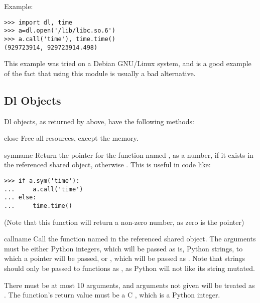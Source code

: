 Example:

\begin{verbatim}
>>> import dl, time
>>> a=dl.open('/lib/libc.so.6')
>>> a.call('time'), time.time()
(929723914, 929723914.498)
\end{verbatim}

This example was tried on a Debian GNU/Linux system, and is a good
example of the fact that using this module is usually a bad alternative.

\subsection{Dl Objects \label{dl-objects}}

Dl objects, as returned by  above, have the
following methods:

\begin{methoddesc}{close}{}
Free all resources, except the memory.
\end{methoddesc}

\begin{methoddesc}{sym}{name}
Return the pointer for the function named , as a number, if
it exists in the referenced shared object, otherwise . This
is useful in code like:

\begin{verbatim}
>>> if a.sym('time'): 
...     a.call('time')
... else: 
...     time.time()
\end{verbatim}

(Note that this function will return a non-zero number, as zero is the
\NULL{} pointer)
\end{methoddesc}

\begin{methoddesc}{call}{name}
Call the function named  in the referenced shared object.
The arguments must be either Python integers, which will be 
passed as is, Python strings, to which a pointer will be passed, 
or , which will be passed as \NULL.  Note that 
strings should only be passed to functions as , as
Python will not like its string mutated.

There must be at most 10 arguments, and arguments not given will be
treated as . The function's return value must be a C
, which is a Python integer.
\end{methoddesc}
